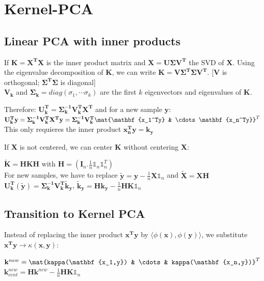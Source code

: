\documentclass[english]{latex4ei/latex4ei_sheet}
\begin{document}
\section{Kernel-PCA}
\begin{sectionbox}
\subsection{Linear PCA with inner products}
If $\mathbf{K}=\mathbf{X^TX}$ is the inner product matrix and $\mathbf{X=U\Sigma V^T}$ the SVD of $\mathbf{X}$. Using the eigenvalue decomposition of $\mathbf{K}$, we can write $\mathbf{K=V\Sigma^T\Sigma V^T}$. [$\mathbf{V}$ is orthogonal; $\mathbf{\Sigma^T\Sigma}$ is diagonal]\\
$\mathbf{V_k}$ and $\mathbf{\Sigma_k}=diag(\sigma_1, \cdots\sigma_k)$ are the first $k$ eigenvectors and eigenvalues of $\mathbf{K}$.
\begin{emphbox}
    Therefore: $\mathbf{U_k^T}=\mathbf{\Sigma_k^{-1}V_k^TX^T}$ and for a new sample $\mathbf{y}$:\\
    $\mathbf{U_k^Ty}=\mathbf{\Sigma_k^{-1}V_k^TX^Ty}=\mathbf{\Sigma_k^{-1}V_k^T}\mat{\mathbf{x_1^Ty} & \cdots \mathbf{x_n^Ty}}^T$\\
    This only requieres the inner product $\mathbf{x_n^Ty=k_y}$
\end{emphbox}
If \textbf{X} is not centered, we can center $\mathbf{K}$ without centering \textbf{X}:
\begin{center}
    $\mathbf{\tilde{K}=HKH}$ with $\mathbf{H}=(\mathbf{I}_n.\frac{1}{n}\mathds{1}_n\mathds{1}_n^T)$\\
    For new samples, we have to replace $\mathbf{\tilde{y}}=\mathbf{y}-\frac{1}{n}\mathbf{X}\mathds{1}_n$ and $\mathbf{\tilde{X}=XH}$\\
    $\mathbf{U_k^T}(\mathbf{\tilde{y}})=\mathbf{\Sigma_k^{-1}V_k^T\tilde{k}_y}$, \quad $\mathbf{\tilde{k}_y=Hk_y-}\frac{1}{n}\mathbf{HK}\mathds{1}_n$
\end{center}

\subsection{Transition to Kernel PCA}
Instead of replacing the inner product $\mathbf{x^Ty}$ by $\langle\phi(\mathbf{x}),\phi(\mathbf{y})\rangle$, we substitute $\mathbf{x^Ty}\rightarrow\kappa(\mathbf{x,y})$:
\begin{emphbox}
    $\mathbf{k}^{new}=\mat{kappa(\mathbf{x_1,y}) & \cdots & kappa(\mathbf{x_n,y})}^T$\\
    $\mathbf{k}_{cent}^{new}=\mathbf{Hk}_{}^{new}-\frac{1}{n}\mathbf{HK}\mathds{1}_n$
\end{emphbox}

\end{sectionbox}
\end{document}

